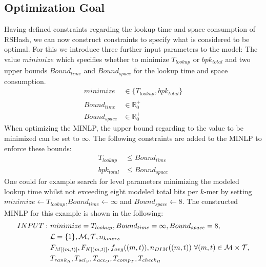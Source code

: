 \documentclass[a4paper,titlepage,onecolumn,oneside,12pt,nenglish,titlepage=firstiscover]{scrbook}
\theoremstyle{plain} %
\theoremstyle{definition} %
\theoremstyle{remark} %
\theoremstyle{plain}
\newcommand{\RR}{\mathbb{R}} %
\newcommand{\minimizerLength}{m}
\newcommand{\threshold}{t}
\newcommand{\access}{acc}
\newcommand{\contains}{rank}
\newcommand{\select}{sel}
\newcommand{\compare}{comp}
\newcommand{\timeForOperationOnStructure}[2]{T_{#1_{#2}}} %
\newcommand{\averageFrequency}{f_{avg}}
\newcommand{\possibleMinimizerLengths}{\mathcal{M}}
\newcommand{\possibleThresholds}{\mathcal{T}}
\begin{document}
\subsection{Optimization Goal} \label{sec:optimizationGoal}
\newcommand{\minimize}{minimize}
\newcommand{\boundTime}{Bound_{time}}
\newcommand{\boundSpace}{Bound_{space}}
Having defined constraints regarding the lookup time and space consumption of RSHash, we can now construct constraints to specify what is considered to be optimal. For this we introduce three further input parameters to the model: The value $\minimize$ which specifies whether to minimize $\timeForOperationOnStructure{lookup}{}$ or $bpk_{total}$ and two upper bounds $\boundTime$ and $\boundSpace$ for the lookup time and space consumption. 
\begin{align*}
	\minimize			&\in \{\timeForOperationOnStructure{lookup}{}, bpk_{total}\} \\
	\boundTime	&\in \RR_0^+\\
	\boundSpace		&\in \RR_0^+
\end{align*}
When optimizing the MINLP, the upper bound regarding to the value to be minimized can be set to $\infty$. The following constraints are added to the MINLP to enforce these bounds:
\begin{align}
	\timeForOperationOnStructure{lookup}{} &\leq \boundTime \label{constraint:boundTime}\\
	bpk_{total} &\leq \boundSpace \label{constraint:boundBpk}
\end{align}
One could for example search for level parameters minimizing the modeled lookup time whilst not exceeding eight modeled total bits per $k$-mer by setting $\minimize \leftarrow \timeForOperationOnStructure{lookup}{}$,$\boundTime \leftarrow \infty$ and $\boundSpace \leftarrow 8$. The constructed MINLP for this example is shown in the following:
\begin{align*}
	INPUT: ~
	&\minimize = \timeForOperationOnStructure{lookup}{},
	\boundTime = \infty,
	\boundSpace = 8,
	\\
	&\setOfLevels = \{1\}, \possibleMinimizerLengths, \possibleThresholds, \nkmers
	\\
	&\CDF{\compactZV{M}{(\minimizerLength, \threshold)}}, \CDF{\compactZV{K}{(\minimizerLength, \threshold)}},
	\averageFrequency((\minimizerLength, \threshold)),
	\numberOfDistinctMinimizers{(\minimizerLength, \threshold)} ~ \forall (\minimizerLength, \threshold) \in \possibleMinimizerLengths \times \possibleThresholds,
	\\
	&\timeForOperationOnStructure{\contains}{R},
	\timeForOperationOnStructure{\select}{S},
	\timeForOperationOnStructure{\access}{O},
	\timeForOperationOnStructure{\compare}{T},
	\timeForOperationOnStructure{check}{H}
\end{align*}
\end{document}
